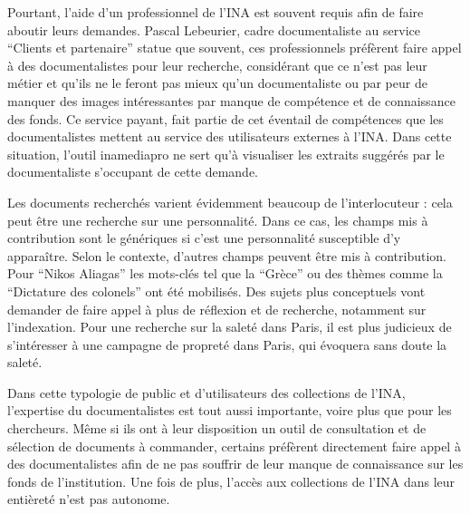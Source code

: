 Pourtant, l'aide d'un professionnel de l'INA est souvent requis afin de faire aboutir leurs demandes. Pascal Lebeurier, cadre documentaliste au service \enquote{Clients et partenaire} statue que souvent, ces professionnels préfèrent faire appel à des documentalistes pour leur recherche, considérant que ce n'est pas leur métier et qu'ils ne le feront pas mieux qu'un documentaliste ou par peur de manquer des images intéressantes par manque de compétence et de connaissance des fonds. Ce service payant, fait partie de cet éventail de compétences que les documentalistes mettent au service des utilisateurs externes à l'INA. Dans cette situation, l'outil inamediapro ne sert qu'à visualiser les extraits suggérés par le documentaliste s'occupant de cette demande.


Les documents recherchés varient évidemment beaucoup de l'interlocuteur : cela peut être une recherche sur une personnalité. Dans ce cas, les champs mis à contribution sont le génériques si c'est une personnalité susceptible d'y apparaître. Selon le contexte, d'autres champs peuvent être mis à contribution. Pour \enquote{Nikos Aliagas} les mots-clés tel que la \enquote{Grèce} ou des thèmes comme la \enquote{Dictature des colonels} ont été mobilisés. Des sujets plus conceptuels vont demander de faire appel à plus de réflexion et de recherche, notamment sur l'indexation. Pour une recherche sur la saleté dans Paris, il est plus judicieux de s'intéresser à une campagne de propreté dans Paris, qui évoquera sans doute la saleté. 


Dans cette typologie de public et d'utilisateurs des collections de l'INA, l'expertise du documentalistes est tout aussi importante, voire plus que pour les chercheurs. Même si ils ont à leur disposition un outil de consultation et de sélection de documents à commander, certains préfèrent directement faire appel à des documentalistes afin de ne pas souffrir de leur manque de connaissance sur les fonds de l'institution. Une fois de plus, l'accès aux collections de l'INA dans leur entièreté n'est pas autonome. 